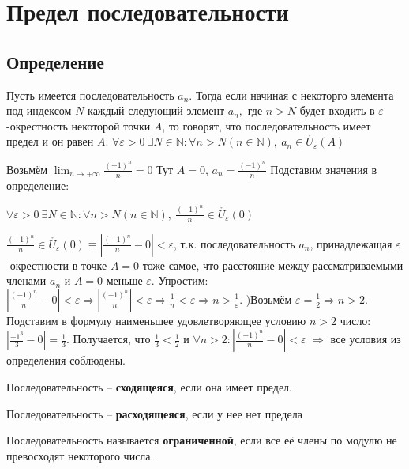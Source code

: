 \chapter{Предел последовательности}
\section{Определение}
Пусть имеется последовательность $a_n$. Тогда если начиная с некоторго элемента под индексом $N$ каждый следующий элемент $a_n,$ где $n>N$ будет входить в $\varepsilon$-окрестность некоторой точки $A$, то говорят, что последовательность имеет предел и он равен $A$. \newline
$\forall \varepsilon > 0\ \exists N \in \mathbb{N} : \forall n > N(n \in \mathbb{N}),\ a_n \in \mathring{U_\varepsilon}(A)$
\begin{example}
Возьмём $\displaystyle \lim_{n \to +\infty}\frac{(-1)^n}{n} = 0$
\newline
Тут $A = 0$, $a_n = \frac{(-1)^n}{n}$
\newline
Подставим значения в определение:
\begin{center}$\forall\varepsilon > 0\ \exists N \in \mathbb{N} : \forall n > N(n \in \mathbb{N}),\ \frac{(-1)^n}{n} \in \mathring{U_\varepsilon}(0)$\end{center}
$\frac{(-1)^n}{n} \in \mathring{U_\varepsilon}(0) \equiv |\frac{(-1)^n}{n} - 0| < \varepsilon$, т.к. последовательность $a_n$, принадлежащая $\varepsilon$-окрестности в точке $A = 0$ тоже самое, что расстояние между рассматриваемыми членами $a_n$ и $A = 0$ меньше $\varepsilon$.\newline
Упростим: $|\frac{(-1)^n}{n} - 0| < \varepsilon \Rightarrow |\frac{(-1)^n}{n}| < \varepsilon \Rightarrow \frac{1}{n} < \varepsilon \Rightarrow n > \frac{1}{\varepsilon} $. )Возьмём $\varepsilon = \frac{1}{2} \Rightarrow n > 2$. Подставим в формулу наименьшее удовлетворяющее условию $n > 2$ число: $|\frac{-1^3}{3} - 0| = \frac{1}{3}$. Получается, что $\frac{1}{3} < \frac{1}{2}$ и $\forall n > 2: |\frac{(-1)^n}{n} - 0| < \varepsilon$ $\Rightarrow$ все условия из определения соблюдены. \newline
\end{example}

\begin{mydef}Последовательность -- \textbf{сходящеяся}, если она имеет предел.\end{mydef}
\begin{mydef}Последовательность -- \textbf{расходящеяся}, если у нее нет предела\end{mydef}
\begin{mydef}Последовательность называется \textbf{ограниченной}, если все её члены по модулю не превосходят некоторого числа.\end{mydef}

